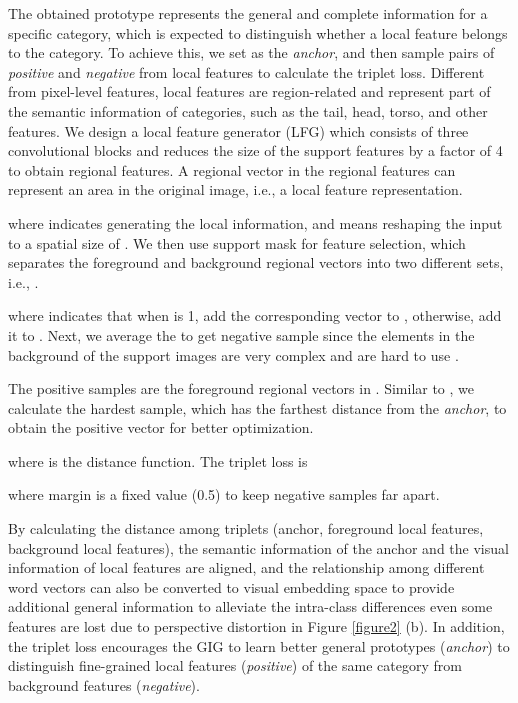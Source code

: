 \documentclass[10pt,twocolumn,letterpaper]{article}
\begin{document}
The obtained prototype  represents the general and complete information for a specific category, which is expected to distinguish whether a local feature belongs to the category. To achieve this, we set  as the \textit{anchor}, and then sample pairs of \textit{positive} and \textit{negative} from local features to calculate the triplet loss. Different from pixel-level features, local features are region-related and represent part of the semantic information of categories, such as the tail, head, torso, and other features. We design a local feature generator (LFG) which consists of three convolutional blocks and reduces the size of the support features by a factor of 4 to obtain regional features. A regional vector  in the regional features  can represent an area in the original image, i.e., a local feature representation.

where  indicates generating the local information, and  means reshaping the input to a spatial size of . We then use support mask  for feature selection, which separates the foreground and background regional vectors into two different sets, i.e., .



\vspace{-5.5mm}


\vspace{-5.5mm}

where  indicates that when  is 1, add the corresponding vector  to , otherwise, add it to . Next, we average the  to get negative sample since the elements in the background of the support images are very complex and are hard to use \cite{panet}.

\par
The positive samples are the foreground regional vectors in . Similar to \cite{indefense}, we calculate the hardest sample, which has the farthest distance from the \textit{anchor}, to obtain the positive vector for better optimization.

where  is the  distance function. The triplet loss  is

where margin is a fixed value (0.5) to keep negative samples far apart. \par
By calculating the distance among triplets (anchor, foreground local features, background local features), the semantic information of the anchor and the visual information of local features are aligned, and the relationship among different word vectors can also be converted to visual embedding space to provide additional general information to alleviate the intra-class differences even some features are lost due to perspective distortion in Figure \ref{figure2} (b). In addition, the triplet loss encourages the GIG to learn better general prototypes (\textit{anchor}) to distinguish fine-grained local features (\textit{positive}) of the same category from background features (\textit{negative}). 
\end{document}
